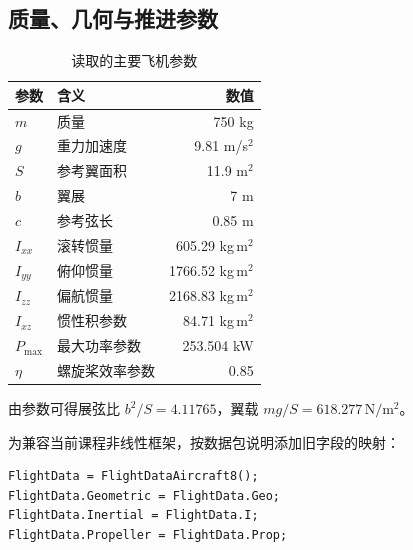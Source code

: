 \documentclass[UTF8,a4paper,11pt,fontset=windows]{ctexart}
\begin{document}
\subsection{质量、几何与推进参数}
\begin{table}[H]\centering
\caption{读取的主要飞机参数}
\begin{tabular}{llr}\toprule
参数&含义&数值\\\midrule
$m$&质量&750 kg\\
$g$&重力加速度&9.81 m/s$^2$\\
$S$&参考翼面积&11.9 m$^2$\\
$b$&翼展&7 m\\
$c$&参考弦长&0.85 m\\
$I_{xx}$&滚转惯量&605.29 kg\,m$^2$\\
$I_{yy}$&俯仰惯量&1766.52 kg\,m$^2$\\
$I_{zz}$&偏航惯量&2168.83 kg\,m$^2$\\
$I_{xz}$&惯性积参数&84.71 kg\,m$^2$\\
$P_{\max}$&最大功率参数&253.504 kW\\
$\eta$&螺旋桨效率参数&0.85\\\bottomrule
\end{tabular}
\end{table}
由参数可得展弦比 $b^2/S=4.11765$，翼载 $mg/S=618.277\,\mathrm{N/m^2}$。

为兼容当前课程非线性框架，按数据包说明添加旧字段的映射：
\begin{lstlisting}
FlightData = FlightDataAircraft8();
FlightData.Geometric = FlightData.Geo;
FlightData.Inertial = FlightData.I;
FlightData.Propeller = FlightData.Prop;
\end{lstlisting}
\end{document}
